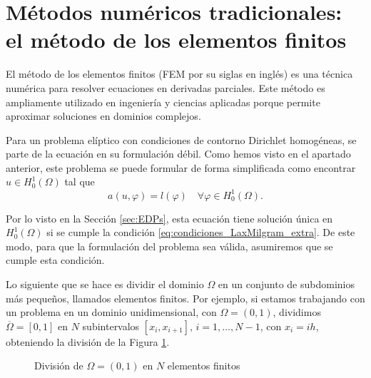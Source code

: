 \documentclass[a4paper,11pt,spanish, twoside, leqno]{tfg-uam}
\theoremstyle{definition}
\begin{document}
\section{Métodos numéricos tradicionales: el método de los elementos finitos}\label{sc:FEM}

El método de los elementos finitos (FEM por su siglas en inglés) es una técnica numérica para resolver ecuaciones en derivadas parciales. Este método es ampliamente utilizado en ingeniería y ciencias aplicadas porque permite aproximar soluciones en dominios complejos.

Para un problema elíptico con condiciones de contorno Dirichlet homogéneas, se parte de la ecuación en su formulación débil. Como hemos visto en el apartado anterior, este problema se puede formular de forma simplificada como encontrar $u\in H_0^1(\Omega)$ tal que
\begin{equation*}
    a(u,\varphi) = l(\varphi) \quad \forall \varphi\in  H_0^1(\Omega).
\end{equation*}

Por lo visto en la Sección \ref{sec:EDPs}, esta ecuación tiene solución única en $H_0^1(\Omega)$ si se cumple la condición \eqref{eq:condiciones_LaxMilgram_extra}. De este modo, para que la formulación del problema sea válida, asumiremos que se cumple esta condición.

Lo siguiente que se hace es dividir el dominio $\Omega$ en un conjunto de subdominios más pequeños, llamados elementos finitos. Por ejemplo, si estamos trabajando con un problema en un dominio unidimensional, con $\Omega =(0,1)$, dividimos $\overline{\Omega} = [0,1]$ en $N$ subintervalos $[x_i,x_{i+1}], \, i = 1, \dots, N-1$, con $x_i = ih$, obteniendo la división de la Figura \ref{fig:DivisionOmega}.

\begin{figure}
    \centering
    \caption{División de $\Omega = (0,1)$ en $N$ elementos finitos}
    \label{fig:DivisionOmega}
\end{figure}
\end{document}
